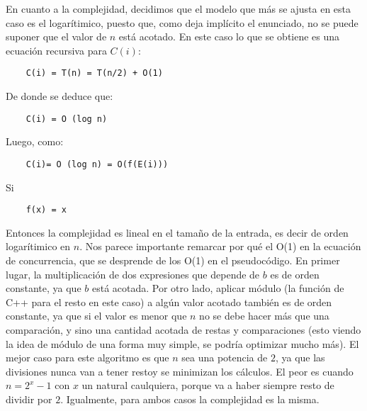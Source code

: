 \newline
En cuanto a la complejidad, decidimos que el modelo que más se ajusta en esta caso es el logarítimico, puesto que, como deja implícito el enunciado, no se puede suponer que el valor de $n$ está acotado. En este caso lo que se obtiene es una ecuación recursiva para $C(i)$:
\begin{verbatim}
    C(i) = T(n) = T(n/2) + O(1)
\end{verbatim}
De donde se deduce que:
\begin{verbatim}
    C(i) = O (log n) 	  
\end{verbatim}
Luego, como:
\begin{verbatim}
    C(i)= O (log n) = O(f(E(i)))  
\end{verbatim}
Si
\begin{verbatim}
    f(x) = x 	  
\end{verbatim}
Entonces la complejidad es lineal en el tamaño de la entrada, es decir de orden logarítimico en $n$.
\newline
Nos parece importante remarcar por qué el O(1) en la ecuación de concurrencia, que se desprende de los O(1) en el pseudocódigo. En primer lugar, la multiplicación de dos expresiones que depende de $b$ es de orden constante, ya que $b$ está acotada. Por otro lado, aplicar módulo (la función de C++ para el resto en este caso) a algún valor acotado también es de orden constante, ya que si el valor es menor que $n$ no se debe hacer más que una comparación, y sino una cantidad acotada de restas y comparaciones (esto viendo la idea de módulo de una forma muy simple, se podría optimizar mucho más).
\newline
El mejor caso para este algoritmo es que $n$ sea una potencia de $2$, ya que las divisiones nunca van a tener restoy se minimizan los cálculos. El peor es cuando $n = 2^x -1$ con $x$ un natural caulquiera, porque va a haber siempre resto de dividir por $2$. Igualmente, para ambos casos la complejidad es la misma.
